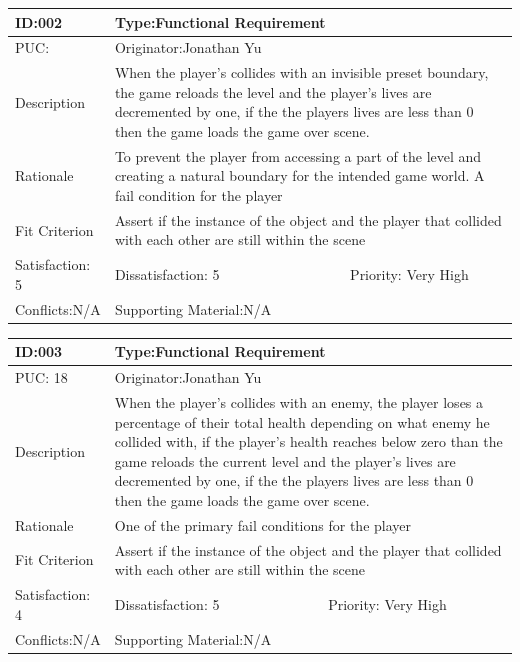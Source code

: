 \documentclass{article}
\begin{document}
\begin{table}[H]

\begin{tabular}{|l|l|l|}
\hline
ID:002 & \multicolumn{2}{l|}{Type:Functional Requirement} \\ \hline
PUC: & \multicolumn{2}{l|}{Originator:Jonathan Yu} \\ \hline
Description & \multicolumn{2}{m{0.85\textwidth}|}{When the player’s collides with an invisible preset boundary, the game reloads the level and the player’s lives are decremented by one, if the the players lives are less than 0 then the game loads the game over scene.} \\ \hline
Rationale & \multicolumn{2}{m{0.85\textwidth}|}{To prevent the player from accessing a part of the level and creating a natural boundary for the intended game world. A fail condition for the player} \\ \hline
Fit Criterion & \multicolumn{2}{m{0.85\textwidth}|}{Assert if the instance of the object and the player that collided with each other are still within the scene} \\ \hline
Satisfaction: 5 & Dissatisfaction: 5 & Priority: Very High \\ \hline
Conflicts:N/A & Supporting Material:N/A &  \\ \hline
\end{tabular}
\end{table}



\begin{table}[H]
\begin{tabular}{|l|l|l|}
\hline
ID:003 & \multicolumn{2}{l|}{Type:Functional Requirement} \\ \hline
PUC: 18 & \multicolumn{2}{l|}{Originator:Jonathan Yu} \\ \hline
Description & \multicolumn{2}{m{0.85\textwidth}|}{When the player’s collides with an enemy, the player loses a percentage of their total health depending on what enemy he collided with, if the player’s health reaches below zero than the game reloads the current level and the player’s lives are decremented by one, if the the players lives are less than 0 then the game loads the game over scene.} \\ \hline
Rationale & \multicolumn{2}{m{0.85\textwidth}|}{One of the primary fail conditions for the player} \\ \hline
Fit Criterion & \multicolumn{2}{m{0.85\textwidth}|}{Assert if the instance of the object and the player that collided with each other are still within the scene} \\ \hline
Satisfaction: 4 & Dissatisfaction: 5 & Priority: Very High \\ \hline
Conflicts:N/A & \multicolumn{2}{l|}{Supporting Material:N/A} \\ \hline
\end{tabular}
\end{table}
\end{document}
